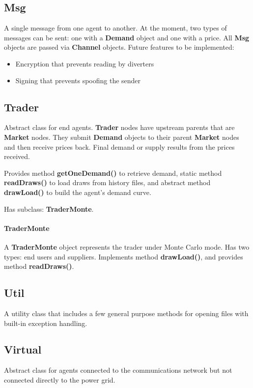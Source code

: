 \documentclass[12pt]{article}
\begin{document}
\subsection{Msg} \mbox{}
\label{subsec:objects_msg}

A single message from one agent to another.  At the moment, two types of 
messages can be sent: one with a \textbf{Demand} object and one with a 
price.  All \textbf{Msg} objects are passed via \textbf{Channel} objects. Future 
features to be implemented:

\begin{itemize}
  \item{Encryption that prevents reading by diverters}
  \item{Signing that prevents spoofing the sender}
\end{itemize}

\subsection{Trader} \mbox{}
\label{subsec:objects_trader}

Abstract class for end agents. \textbf{Trader} nodes have upstream parents
that are \textbf{Market} nodes.  They submit \textbf{Demand} objects 
to their parent \textbf{Market} nodes and then receive prices back. 
Final demand or supply results from the prices received. 

Provides method \textbf{getOneDemand()} to retrieve demand, static method 
\textbf{readDraws()} to load draws from history files, and abstract method 
\textbf{drawLoad()} to build the agent's demand curve.

Has subclass: \textbf{TraderMonte}.

\paragraph{TraderMonte} \mbox{}

A \textbf{TraderMonte} object represents the trader under Monte Carlo mode. 
Has two types: end users and suppliers. Implements method \textbf{drawLoad()}, 
and provides method \textbf{readDraws()}.

\subsection{Util} \mbox{}
\label{subsec:objects_util}

A utility class that includes a few general purpose methods for opening
files with built-in exception handling.

\subsection{Virtual} \mbox{}
\label{subsec:obejcts_virtual}

Abstract class for agents connected to the communications network but not
connected directly to the power grid.  
\end{document}
